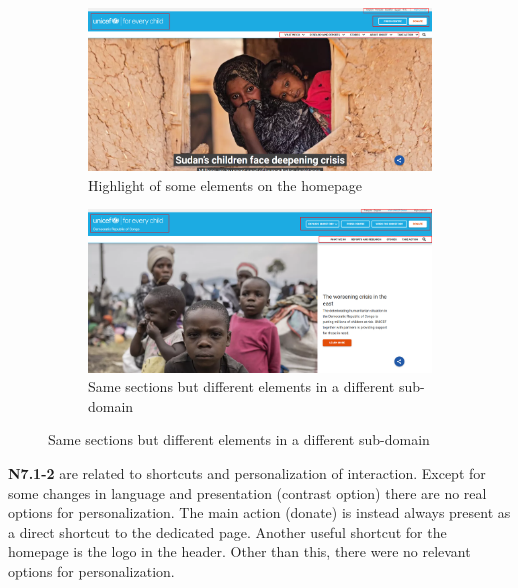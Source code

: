 \begin{figure}[h]
    \centering
	\begin{subfigure}[b]{0.48\textwidth}
        \centering
        \includegraphics[width=\textwidth]{img/critical_heuristics/N4.1a.png}
        \caption{Highlight of some elements on the homepage}
        \label{fig:4.1a}
    \end{subfigure}
    \hfill
    \begin{subfigure}[b]{0.48\textwidth}
        \centering
        \includegraphics[width=\textwidth]{img/critical_heuristics/N4.1b.png}
        \caption{Same sections but different elements in a different sub-domain}
        \label{fig:4.1b}
    \end{subfigure}
\end{figure}

\vspace{1em}

\textbf{N7.1-2} are related to shortcuts and personalization of interaction. Except for some changes in language and presentation (contrast option) there are no real options for personalization.
The main action (donate) is instead always present as a direct shortcut to the dedicated page. Another useful shortcut for the homepage is the logo in the header. Other than this, there were no relevant options for personalization.

